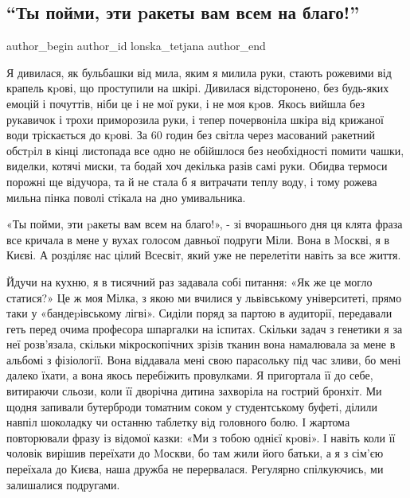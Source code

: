  
 
 
 
 
 
\subsection{\enquote{Ты пойми, эти pакеты вам всем на благо!}}
\label{sec:13_12_2022.fb.lonska_tetjana.1.rakety}
 
\ifcmt
 author_begin
   author_id lonska_tetjana
 author_end
\fi

Я дивилася, як бульбашки від мила, яким я милила руки, стають рожевими від
крапель кpові, що проступили на шкірі. Дивилася відсторонено, без будь-яких
емоцій і почуттів, ніби це і не мої руки, і не моя кpов. Якось вийшла без
рукавичок і трохи приморозила руки, і тепер почервоніла шкіра від крижаної води
тріскається до кpові.   За 60 годин без світла через масований pакетний обстpіл
в кінці листопада все одно не обійшлося без необхідності помити чашки, виделки,
котячі миски, та бодай хоч декілька разів самі руки. Обидва термоси порожні ще
відучора, та й не стала б я витрачати теплу воду, і тому рожева мильна пінка
поволі стікала на дно умивальника.

«Ты пойми, эти pакеты вам всем на благо!», - зі вчорашнього дня ця клята
фраза все кричала в мене у вухах голосом давньої подруги Міли. Вона в
Mоскві, я в Києві. А розділяє нас цілий Всесвіт, який уже не перелетіти
навіть за все життя. 

Йдучи на кухню, я в тисячний раз задавала собі питання: «Як же це могло
статися?» Це ж моя Мілка, з якою ми вчилися у львівському університеті,
прямо таки у «бандеpівському лігві». Сиділи поряд за партою в аудиторії,
передавали геть перед очима професора шпаргалки на іспитах. Скільки задач
з генетики я за неї розв'язала, скільки мікроскопічних зрізів тканин вона
намалювала за мене в альбомі з фізіології. Вона віддавала мені свою
парасольку під час зливи, бо мені далеко їхати, а вона якось перебіжить
провулками. Я пригортала її до себе, витираючи сльози, коли її дворічна
дитина захворіла на гострий бронхіт. Ми щодня запивали бутерброди томатним
соком у студентському буфеті, ділили навпіл шоколадку чи останню таблетку
від головного болю. І жартома повторювали фразу із відомої казки: «Ми з
тобою однієї кpові». І навіть коли її чоловік вирішив переїхати до Mоскви,
бо там жили його батьки, а я з сім'єю переїхала до Києва, наша дружба не
перервалася. Регулярно спілкуючись, ми залишалися подругами. 

